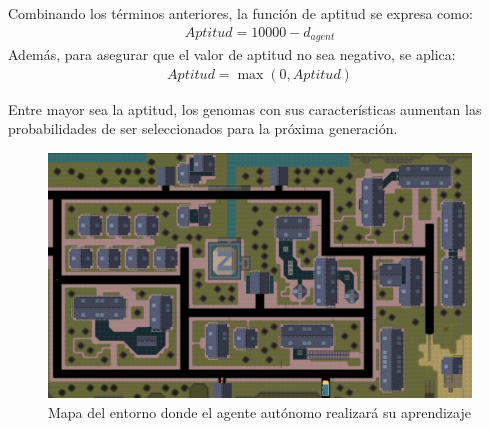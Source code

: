 \documentclass[conference]{IEEEtran}
\begin{document}
Combinando los términos anteriores, la función de aptitud se expresa como:
\begin{align*} 
Aptitud = 10000 - d_{agent} 
\end{align*}
Además, para asegurar que el valor de aptitud no sea negativo, se aplica:
\begin{align*} 
Aptitud = \max(0, Aptitud) 
\end{align*}

Entre mayor sea la aptitud, los genomas con sus características aumentan las probabilidades de ser seleccionados para la próxima generación.
\begin{figure}
    \centering
    \includegraphics[scale=0.14]{images/gta2.png}
    \caption{Mapa del entorno donde el agente autónomo realizará su aprendizaje}
    \label{fig:Mapa}
\end{figure} 
\end{document}
